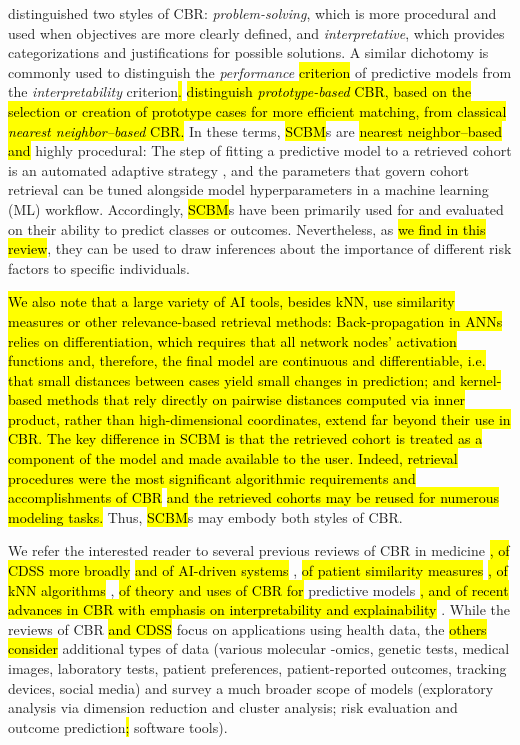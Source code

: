 \documentclass[sn-mathphys,Numbered,pdflatex]{sn-jnl}
\theoremstyle{remark}
\theoremstyle{definition}
\begin{document}
\citet{Kolodner1992} distinguished two styles of CBR:
\emph{problem-solving}, which is more procedural and used when
objectives are more clearly defined, and \emph{interpretative}, which
provides categorizations and justifications for possible solutions. A
similar dichotomy is commonly used to distinguish the \emph{performance}
\hl{criterion }of predictive models from the \emph{interpretability}
criterion\hl{.}
\citet{Rudin2022}\hl{ distinguish \emph{prototype-based} CBR, based on the selection or creation of prototype cases for more efficient matching, from classical \emph{nearest neighbor--based} CBR.}
In these terms, \hl{SCBM}s are \hl{nearest neighbor--based and }highly
procedural: The step of fitting a predictive model to a retrieved cohort
is an automated adaptive strategy \citep{Begum2011}, and the parameters
that govern cohort retrieval can be tuned alongside model
hyperparameters in a machine learning (ML) workflow. Accordingly,
\hl{SCBM}s have been primarily used for and evaluated on their ability
to predict classes or outcomes. Nevertheless, as
\hl{we find in this review}, they can be used to draw inferences about
the importance of different risk factors to specific individuals.

\hl{We also note that a large variety of AI tools, besides kNN, use similarity measures or other relevance-based retrieval methods: Back-propagation in ANNs relies on differentiation, which requires that all network nodes' activation functions and, therefore, the final model are continuous and differentiable, i.e. that small distances between cases yield small changes in prediction; and kernel-based methods that rely directly on pairwise distances computed via inner product, rather than high-dimensional coordinates, extend far beyond their use in CBR. The key difference in SCBM is that the retrieved cohort is treated as a component of the model and made available to the user. Indeed, retrieval procedures were the most significant algorithmic requirements and accomplishments of CBR }\citep{Kolodner1992, Gierl1998}\hl{ and the retrieved cohorts may be reused for numerous modeling tasks.}
Thus, \hl{SCBM}s may embody both styles of CBR.

We refer the interested reader to several previous reviews of CBR in
medicine
\citep{Gierl1998, Begum2011, Choudhury2016}\hl{, of CDSS more broadly }\citep{Wasylewicz2019}\hl{ and of AI-driven systems }\citep{Elhaddad2024},
\hl{of patient similarity measures}
\citep{Dai2020}\hl{, of kNN algorithms }\citep{Halder2024},
\hl{of theory and uses of CBR for} predictive models
\citep{Welch2013, Sharafoddini2017, Parimbelli2018, Badra2023}\hl{, and of recent advances in CBR with emphasis on interpretability and explainability }\citep{Schoenborn2021, Rudin2022}.
While the reviews of CBR \hl{and CDSS }focus on applications using
health data, the \hl{others consider }additional types of data (various
molecular -omics, genetic tests, medical images, laboratory tests,
patient preferences, patient-reported outcomes, tracking devices, social
media) and survey a much broader scope of models (exploratory analysis
via dimension reduction and cluster analysis; risk evaluation and
outcome prediction\hl{; }software tools).
\end{document}
